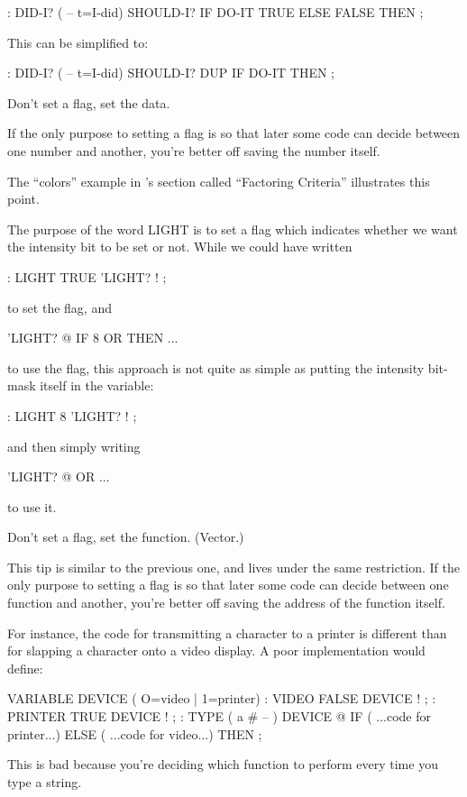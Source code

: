 \begin{Code}
: DID-I?  ( -- t=I-did)
   SHOULD-I?  IF  DO-IT  TRUE  ELSE  FALSE  THEN ;
\end{Code}
This can be simplified to:

\begin{Code}
: DID-I?  ( -- t=I-did)
        SHOULD-I? DUP  IF  DO-IT  THEN ;
\end{Code}
\begin{tip}
Don't set a flag, set the data.
\end{tip}
If the only purpose to setting a flag is so that later some code can decide
between one number and another, you're better off saving the number
itself.

The ``colors'' example in 's section called ``Factoring
Criteria'' illustrates this point.

The purpose of the word LIGHT is to set a flag which indicates
whether we want the intensity bit to be set or not. While we could have
written

\begin{Code}
: LIGHT   TRUE 'LIGHT? ! ;
\end{Code}
to set the flag, and

\begin{Code}
'LIGHT? @ IF  8 OR  THEN ...
\end{Code}
to use the flag, this approach is not quite as simple as putting the
intensity bit-mask itself in the variable:

\begin{Code}
: LIGHT   8 'LIGHT? ! ;
\end{Code}
and then simply writing

\begin{Code}
'LIGHT? @  OR ...
\end{Code}
to use it.

\begin{tip}
Don't set a flag, set the function. (Vector.)
\end{tip}
This tip is similar to the previous one, and lives under the same
restriction. If the only purpose to setting a flag is so that later some
code can decide between one function and another, you're better off saving
the address of the function itself.

For instance, the code for transmitting a character to a printer is
different than for slapping a character onto a video display. A poor
implementation would define:

\begin{Code}
VARIABLE DEVICE  ( O=video | 1=printer)
: VIDEO   FALSE DEVICE ! ;
: PRINTER   TRUE DEVICE ! ;
: TYPE  ( a # -- ) DEVICE @ IF
   ( ...code for printer...) ELSE
   ( ...code for video...)  THEN ;
\end{Code}
This is bad because you're deciding which function to perform every time
you type a string.

